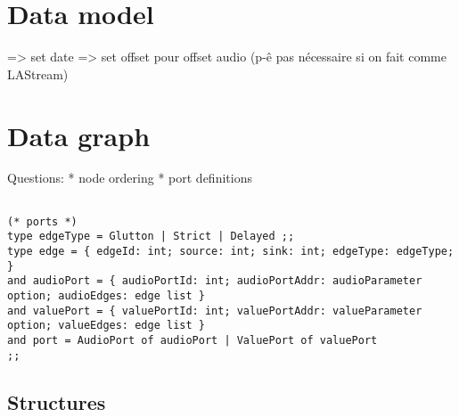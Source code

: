 \documentclass[applsci,article,submit,moreauthors,pdftex,10pt,a4paper]{mdpi}
\begin{document}
\section{Data model}
=> set date
=> set offset pour offset audio (p-ê pas nécessaire si on fait comme LAStream)

\section{Data graph}
Questions: 
* node ordering
* port definitions

\begin{lstlisting}

(* ports *)
type edgeType = Glutton | Strict | Delayed ;;
type edge = { edgeId: int; source: int; sink: int; edgeType: edgeType; } 
and audioPort = { audioPortId: int; audioPortAddr: audioParameter option; audioEdges: edge list } 
and valuePort = { valuePortId: int; valuePortAddr: valueParameter option; valueEdges: edge list } 
and port = AudioPort of audioPort | ValuePort of valuePort
;;

\end{lstlisting}

\subsection{Structures}
\end{document}
